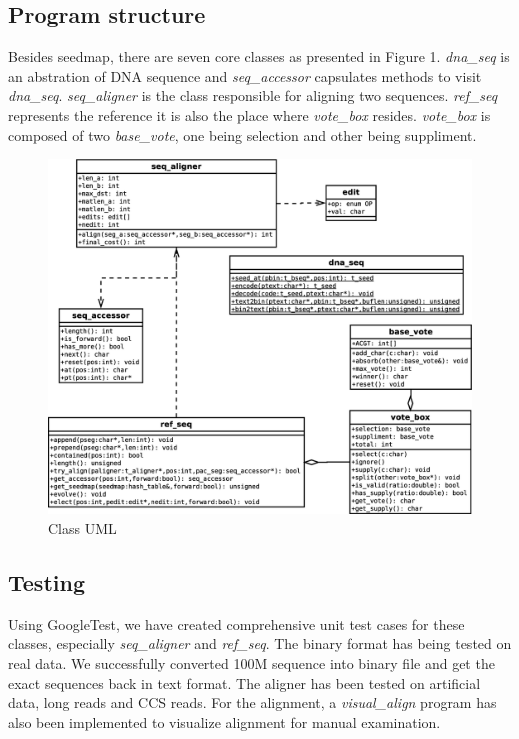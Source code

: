 \documentclass{article}
\begin{document}
\subsection{Program structure}

Besides seedmap, there are seven core classes as presented in Figure 1.
\emph{dna\_seq} is an abstration of DNA sequence and \emph{seq\_accessor}
capsulates methods to visit \emph{dna\_seq}.  \emph{seq\_aligner} is the class
responsible for aligning two sequences.  \emph{ref\_seq} represents the
reference it is also the place where \emph{vote\_box} resides. \emph{vote\_box}
is composed of two \emph{base\_vote}, one being selection and other being
suppliment.

\begin{figure}[t]
    \includegraphics[width=12.5cm, keepaspectratio=true]{class.eps}
    \caption{\label{fig:compare}Class UML}
\end{figure}

\subsection{Testing}

Using GoogleTest, we have created comprehensive unit test cases for
these classes, especially \emph{seq\_aligner} and \emph{ref\_seq}. The
binary format has being tested on real data. We successfully converted
100M sequence into binary file and get the exact sequences back in text
format. The aligner has been tested on artificial data, long reads and
CCS reads. For the alignment, a \emph{visual\_align} program has also
been implemented to visualize alignment for manual examination.
\end{document}
